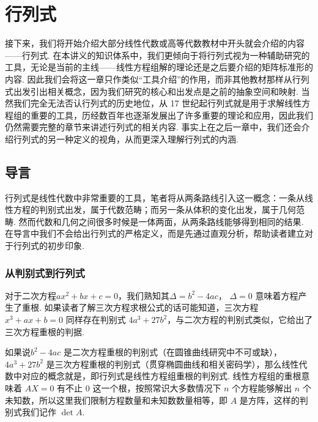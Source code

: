 \chapter{行列式}

接下来，我们将开始介绍大部分线性代数或高等代数教材中开头就会介绍的内容——行列式. 在本讲义的知识体系中，我们更倾向于将行列式视为一种辅助研究的工具，无论是当前的主线——线性方程组解的理论还是之后要介绍的矩阵标准形的内容. 因此我们会将这一章只作类似``工具介绍''的作用，而非其他教材那样从行列式出发引出相关概念，因为我们研究的核心和出发点是之前的抽象空间和映射. 当然我们完全无法否认行列式的历史地位，从 17 世纪起行列式就是用于求解线性方程组的重要的工具，历经数百年也逐渐发展出了许多重要的理论和应用，因此我们仍然需要完整的章节来讲述行列式的相关内容. 事实上在之后一章中，我们还会介绍行列式的另一种定义的视角，从而更深入理解行列式的内涵.

\section{导言}

行列式是线性代数中非常重要的工具，笔者将从两条路线引入这一概念：一条从线性方程的判别式出发，属于代数范畴；而另一条从体积的变化出发，属于几何范畴. 然而代数和几何之间很多时候是一体两面，从两条路线能够得到相同的结果. 在导言中我们不会给出行列式的严格定义，而是先通过直观分析，帮助读者建立对于行列式的初步印象.

\subsection{从判别式到行列式}\label{subsec:从判别式到行列式}

对于二次方程$ax^2 + bx + c = 0$，我们熟知其$\Delta = b^2 - 4ac$， $\Delta = 0$ 意味着方程产生了重根. 如果读者了解三次方程求根公式的话可能知道，三次方程 $x^3+ax+b=0$ 同样存在判别式 $4a^3 + 27b^2$，与二次方程的判别式类似，它给出了三次方程重根的判据.

如果说$b^2 - 4ac$ 是二次方程重根的判别式（在圆锥曲线研究中不可或缺），$4a^3+27b^2$ 是三次方程重根的判别式（贯穿椭圆曲线和相关密码学），那么线性代数中对应的概念就是，即行列式是线性方程组重根的判别式. 线性方程组的重根意味着 $AX=0$ 有不止 $0$ 这一个根，按照常识大多数情况下 $n$ 个方程能够解出 $n$ 个未知数，所以这里我们限制方程数量和未知数数量相等，即 $A$ 是方阵，这样的判别式我们记作 $\det A$.


